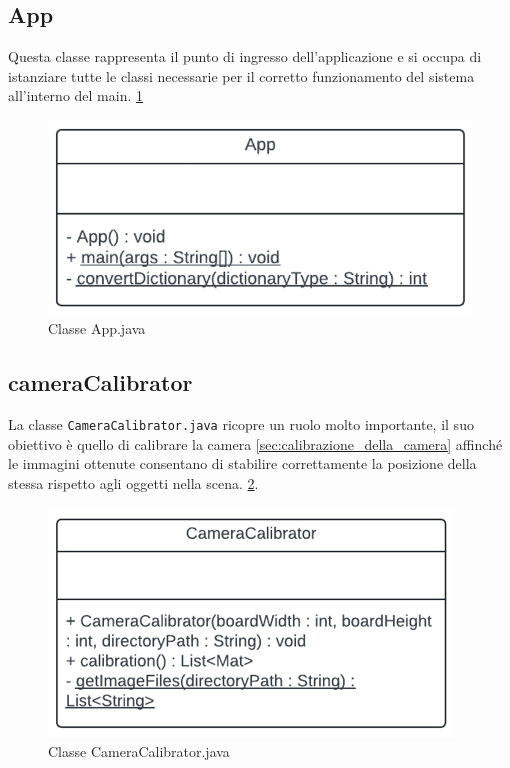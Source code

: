 \documentclass[12pt,a4paper,openright,twoside]{book}
\begin{document}
\subsection{App}
Questa classe rappresenta il punto di ingresso dell'applicazione e si occupa di istanziare tutte le classi necessarie per il corretto funzionamento del sistema all'interno del main. \ref{fig:app}
\begin{figure}
	\centering
	\includegraphics[width=0.5\linewidth]{./figures/UML/app.png}
	\caption{Classe App.java}
	\label{fig:app}
\end{figure}
\subsection{cameraCalibrator}
La classe \texttt{CameraCalibrator.java} ricopre un ruolo molto importante, il suo obiettivo è quello di calibrare la camera \ref{sec:calibrazione_della_camera} affinché le immagini ottenute consentano di stabilire correttamente la posizione della stessa rispetto agli oggetti nella scena. \ref{fig:camera_calibrator}.
\begin{figure}
	\centering
	\includegraphics[width=0.5\linewidth]{./figures/UML/cameraCalibrator.png}
	\caption{Classe CameraCalibrator.java}
	\label{fig:camera_calibrator}
\end{figure}
\end{document}
